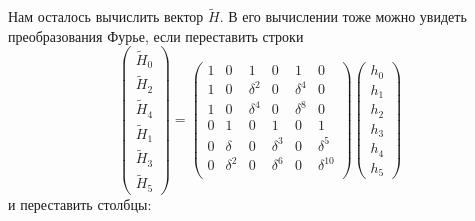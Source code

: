 Нам осталось вычислить вектор $\widetilde{H}$. В его вычислении тоже можно увидеть преобразования Фурье, если переставить строки
\[
    \begin{pmatrix}
        \widetilde{H}_0 \\
        \widetilde{H}_2 \\
        \widetilde{H}_4 \\
        \widetilde{H}_1 \\
        \widetilde{H}_3 \\
        \widetilde{H}_5
    \end{pmatrix}
    =
    \begin{pmatrix}
        1 & 0        & 1        & 0        & 1        & 0           \\
        1 & 0        & \delta^2 & 0        & \delta^4 & 0           \\
        1 & 0        & \delta^4 & 0        & \delta^8 & 0           \\
        0 & 1        & 0        & 1        & 0        & 1           \\
        0 & \delta   & 0        & \delta^3 & 0        & \delta^5    \\
        0 & \delta^2 & 0        & \delta^6 & 0        & \delta^{10} \\
    \end{pmatrix}
    \begin{pmatrix}
        h_0 \\
        h_1 \\
        h_2 \\
        h_3 \\
        h_4 \\
        h_5
    \end{pmatrix}
\]
и переставить столбцы:
